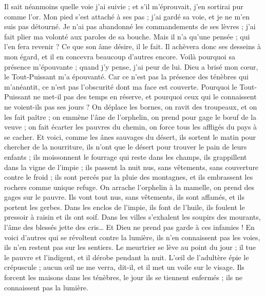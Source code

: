 \begin{multicols}{2}
Il sait néanmoins quelle voie j'ai suivie ; et s'il m'éprouvait, j'en sortirai pur comme l'or.
Mon pied s'est attaché à ses pas ; j'ai gardé sa voie, et je ne m'en suis pas détourné.
Je n'ai pas abandonné les commandements de ses lèvres ; j'ai fait plier ma volonté aux paroles de sa bouche.
Mais il n'a qu'une pensée ; qui l'en fera revenir ? Ce que son âme désire, il le fait.
Il achèvera donc ses desseins à mon égard, et il en concevra beaucoup d'autres encore.
Voilà pourquoi sa présence m'épouvante ; quand j'y pense, j'ai peur de lui.
Dieu a brisé mon cœur, le Tout-Puissant m'a épouvanté.
Car ce n'est pas la présence des ténèbres qui m'anéantit, ce n'est pas l'obscurité dont ma face est couverte.
\VerseOne{}Pourquoi le Tout-Puissant ne met-il pas des temps en réserve, et pourquoi ceux qui le connaissent ne voient-ils pas ses jours ?
On déplace les bornes, on ravit des troupeaux, et on les fait paître ;
on emmène l'âne de l'orphelin, on prend pour gage le bœuf de la veuve ;
on fait écarter les pauvres du chemin, on force tous les affligés du pays à se cacher.
Et voici, comme les ânes sauvages du désert, ils sortent le matin pour chercher de la nourriture, ils n'ont que le désert pour trouver le pain de leurs enfants ;
ils moissonnent le fourrage qui reste dans les champs, ils grappillent dans la vigne de l'impie ;
ils passent la nuit nus, sans vêtements, sans couverture contre le froid ;
ils sont percés par la pluie des montagnes, et ils embrassent les rochers comme unique refuge.
On arrache l'orphelin à la mamelle, on prend des gages sur le pauvre.
Ils vont tout nus, sans vêtements, ils sont affamés, et ils portent les gerbes.
Dans les enclos de l'impie, ils font de l'huile, ils foulent le pressoir à raisin et ils ont soif.
Dans les villes s'exhalent les soupirs des mourants, l'âme des blessés jette des cris… Et Dieu ne prend pas garde à ces infamies !
En voici d'autres qui se révoltent contre la lumière, ils n'en connaissent pas les voies, ils n'en restent pas sur les sentiers.
Le meurtrier se lève au point du jour ; il tue le pauvre et l'indigent, et il dérobe pendant la nuit.
L'œil de l'adultère épie le crépuscule ; aucun œil ne me verra, dit-il, et il met un voile sur le visage.
Ils forcent les maisons dans les ténèbres, le jour ils se tiennent enfermés ; ils ne connaissent pas la lumière.

\end{multicols}
